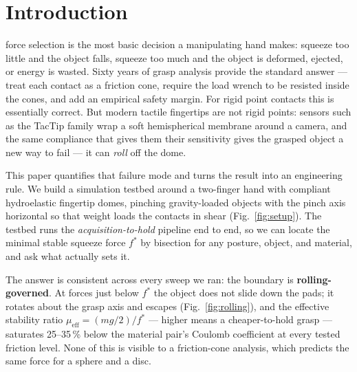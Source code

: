 \documentclass[journal]{IEEEtran}
\newcommand{\mueff}{\mu_{\mathrm{eff}}}
\newcommand{\fstar}{f^{*}}
\begin{document}
\IEEEpeerreviewmaketitle

\section{Introduction}

 force selection is the most basic decision a
manipulating hand makes: squeeze too little and the object falls, squeeze
too much and the object is deformed, ejected, or energy is wasted. Sixty
years of grasp analysis provide the standard answer --- treat each contact
as a friction cone, require the load wrench to be resisted inside the
cones, and add an empirical safety margin. For rigid point contacts this is
essentially correct. But modern tactile fingertips are not rigid points:
sensors such as the TacTip family
\cite{chorley2009development,wardcherrier2018tactip} wrap a soft
hemispherical membrane around a camera, and the same compliance that gives
them their sensitivity gives the grasped object a new way to fail --- it
can \emph{roll} off the dome.

This paper quantifies that failure mode and turns the result into an
engineering rule. We build a simulation testbed around a two-finger hand
with compliant hydroelastic fingertip domes, pinching gravity-loaded
objects with the pinch axis horizontal so that weight loads the contacts in
shear (Fig.~\ref{fig:setup}). The testbed runs the
\emph{acquisition-to-hold} pipeline end to end, so we can locate the
minimal stable squeeze force $\fstar$ by bisection for any posture, object,
and material, and ask what actually sets it.

The answer is consistent across every sweep we ran: the boundary is
\textbf{rolling-governed}. At forces just below $\fstar$ the object does
not slide down the pads; it rotates about the grasp axis and escapes
(Fig.~\ref{fig:rolling}), and the effective stability ratio
$\mueff = (mg/2)/\fstar$ --- higher means a cheaper-to-hold grasp ---
saturates 25--35\,\% below the material pair's Coulomb coefficient at every
tested friction level. None of this is visible to a friction-cone
analysis, which predicts the same force for a sphere and a disc.
\end{document}
